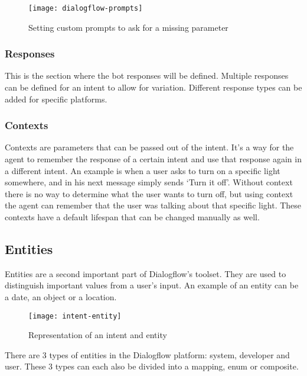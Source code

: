 \newpage

\begin{figure}[ht]
	\centering
	\texttt{[image: dialogflow-prompts]}\label{fig:dialogflow-prompts}
	\caption{Setting custom prompts to ask for a missing parameter}
\end{figure}

\subsubsection{Responses}

This is the section where the bot responses will be defined. Multiple responses can be defined for an intent to allow for variation. Different response types can be added for specific platforms.

\subsubsection{Contexts}

Contexts are parameters that can be passed out of the intent. It's a way for the agent to remember the response of a certain intent and use that response again in a different intent. An example is when a user asks to turn on a specific light somewhere, and in his next message simply sends `Turn it off'. Without context there is no way to determine what the user wants to turn off, but using context the agent can remember that the user was talking about that specific light. These contexts have a default lifespan that can be changed manually as well.

\subsection{Entities}

Entities are a second important part of Dialogflow's toolset. They are used to distinguish important values from a user's input. An example of an entity can be a date, an object or a location.

\begin{figure}[ht]
	\centering
	\texttt{[image: intent-entity]}\label{fig:intent-entity}
	\caption{Representation of an intent and entity}
\end{figure}

There are 3 types of entities in the Dialogflow platform: system, developer and user. These 3 types can each also be divided into a mapping, enum or composite.

